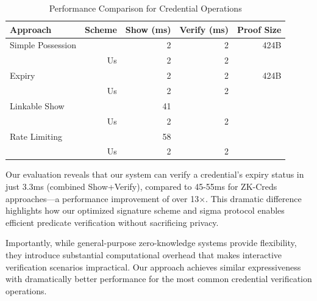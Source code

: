 \begin{table}[htbp]
\centering
\caption{Performance Comparison for Credential Operations}
\label{tab:expiry-comparison}
\begin{tabular}{lrrrr}
\toprule
\textbf{Approach} & \textbf{Scheme} & \textbf{Show (ms)} & \textbf{Verify (ms)} & \textbf{Proof Size} \\
\midrule
Simple Possession & \cite{rosenberg_zk-creds_2022} & 2 & 2 & 424B \\
& Us & 2 & 2 & \\
\midrule
Expiry & \cite{rosenberg_zk-creds_2022} & 2 & 2 & 424B \\
& Us & 2 & 2 & \\
\midrule
Linkable Show & \cite{rosenberg_zk-creds_2022} & 41 &  &  \\
& Us & 2 & 2 & \\
\midrule
Rate Limiting & \cite{rosenberg_zk-creds_2022} & 58 &  &  \\
& Us & 2 & 2 & \\
\bottomrule
\end{tabular}
\end{table}

Our evaluation reveals that our system can verify a credential's expiry status in just 3.3ms (combined Show+Verify), compared to 45-55ms for ZK-Creds approaches—a performance improvement of over 13×. This dramatic difference highlights how our optimized signature scheme and sigma protocol enables efficient predicate verification without sacrificing privacy.

Importantly, while general-purpose zero-knowledge systems provide flexibility, they introduce substantial computational overhead that makes interactive verification scenarios impractical. Our approach achieves similar expressiveness with dramatically better performance for the most common credential verification operations.


